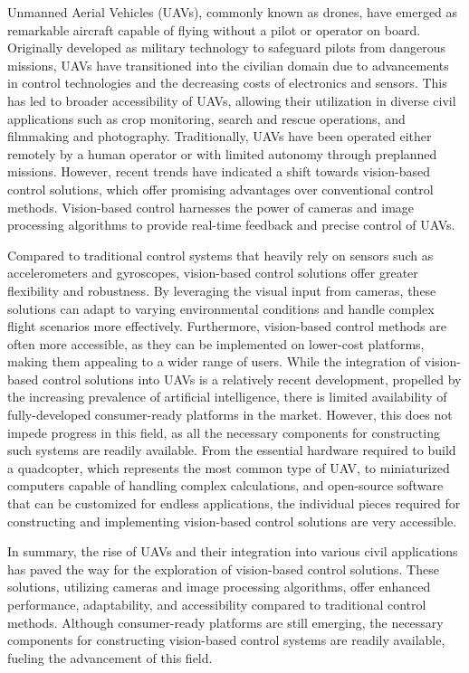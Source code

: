 Unmanned Aerial Vehicles (UAVs), commonly known as drones, have emerged as remarkable aircraft capable of flying without a pilot or operator on board. Originally developed as military technology to safeguard pilots from dangerous missions, UAVs have transitioned into the civilian domain due to advancements in control technologies and the decreasing costs of electronics and sensors. This has led to broader accessibility of UAVs, allowing their utilization in diverse civil applications such as crop monitoring, search and rescue operations, and filmmaking and photography.
Traditionally, UAVs have been operated either remotely by a human operator or with limited autonomy through preplanned missions. However, recent trends have indicated a shift towards vision-based control solutions, which offer promising advantages over conventional control methods. Vision-based control harnesses the power of cameras and image processing algorithms to provide real-time feedback and precise control of UAVs.

Compared to traditional control systems that heavily rely on sensors such as accelerometers and gyroscopes, vision-based control solutions offer greater flexibility and robustness. By leveraging the visual input from cameras, these solutions can adapt to varying environmental conditions and handle complex flight scenarios more effectively. Furthermore, vision-based control methods are often more accessible, as they can be implemented on lower-cost platforms, making them appealing to a wider range of users.
While the integration of vision-based control solutions into UAVs is a relatively recent development, propelled by the increasing prevalence of artificial intelligence, there is limited availability of fully-developed consumer-ready platforms in the market. However, this does not impede progress in this field, as all the necessary components for constructing such systems are readily available. From the essential hardware required to build a quadcopter, which represents the most common type of UAV, to miniaturized computers capable of handling complex calculations, and open-source software that can be customized for endless applications, the individual pieces required for constructing and implementing vision-based control solutions are very accessible.

In summary, the rise of UAVs and their integration into various civil applications has paved the way for the exploration of vision-based control solutions. These solutions, utilizing cameras and image processing algorithms, offer enhanced performance, adaptability, and accessibility compared to traditional control methods. Although consumer-ready platforms are still emerging, the necessary components for constructing vision-based control systems are readily available, fueling the advancement of this field.

